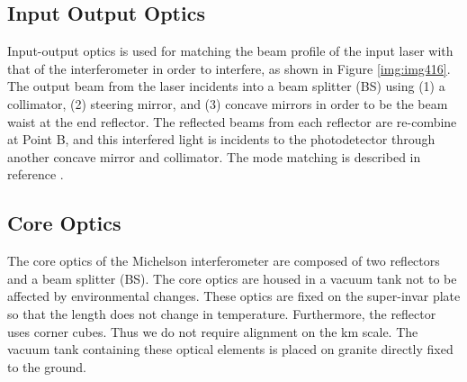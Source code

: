 \subsection{Input Output Optics}
Input-output optics is used for matching the beam profile of the input laser with that of the interferometer in order to interfere, as shown in Figure \ref{img:img416}. The output beam from the laser incidents into a beam splitter (BS) using (1) a collimator, (2) steering mirror, and (3) concave mirrors in order to be the beam waist at the end reflector. The reflected beams from each reflector are re-combine at Point B, and this interfered light is incidents to the photodetector through another concave mirror and collimator. The mode matching is described in reference \cite{miyo2017baseline}.

\subsection{Core Optics}
The core optics of the Michelson interferometer are composed of two reflectors and a beam splitter (BS). The core optics are housed in a vacuum tank not to be affected by environmental changes.  These optics are fixed on the super-invar plate so that the length does not change in temperature. Furthermore, the reflector uses corner cubes. Thus we do not require alignment on the km scale. The vacuum tank containing these optical elements is placed on granite directly fixed to the ground. 

